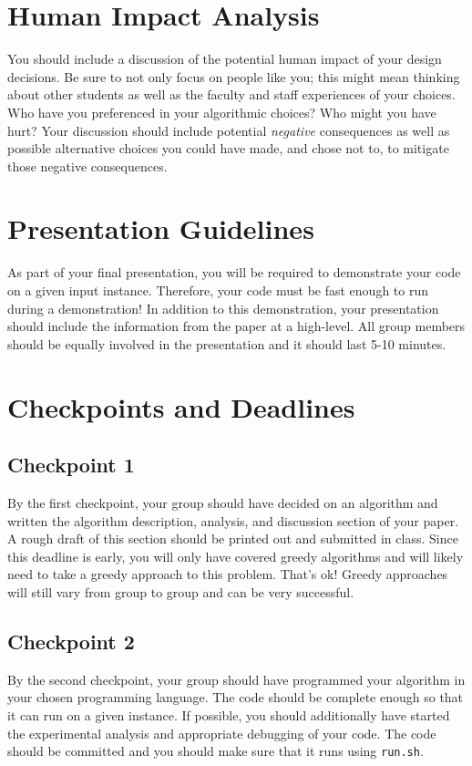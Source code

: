 \documentclass[12pt]{article}
\begin{document}
\section{Human Impact Analysis}
You should include a discussion of the potential human impact of your design decisions.  Be sure to not only focus on people like you; this might mean thinking about other students as well as the faculty and staff experiences of your choices.  Who have you preferenced in your algorithmic choices?  Who might you have hurt?  Your discussion should include potential \emph{negative} consequences as well as possible alternative choices you could have made, and chose not to, to mitigate those negative consequences.

\section{Presentation Guidelines}
As part of your final presentation, you will be required to demonstrate your code on a given input instance. Therefore, your code must be fast enough to run during a demonstration! In addition to this demonstration, your presentation should include the information from the paper at a high-level. All group members should be equally involved in the presentation and it should last 5-10 minutes.

\section{Checkpoints and Deadlines}

\subsection{Checkpoint 1}
By the first checkpoint, your group should have decided on an algorithm and written the algorithm description, analysis, and discussion section of your paper. A rough draft of this section should be printed out and submitted in class.  Since this deadline is early, you will only have covered greedy algorithms and will likely need to take a greedy approach to this problem.  That's ok!  Greedy approaches will still vary from group to group and can be very successful.

\subsection{Checkpoint 2}
By the second checkpoint, your group should have programmed your algorithm in your chosen programming language. The code should be complete enough so that it can run on a given instance. If possible, you should additionally have started the experimental analysis and appropriate debugging of your code. The code should be committed and you should make sure that it runs using \texttt{run.sh}.
\end{document}
